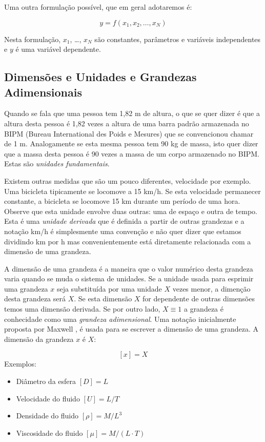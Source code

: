 Uma outra formulação possível, que em geral adotaremos é:

\[
y = f(x_1, x_2, \ldots, x_N)
\]

Nesta formulação, $x_1$, \ldots, $x_N$ são constantes, parâmetros e variáveis independentes e $y$ é uma variável dependente.



\subsection{Dimensões e Unidades e Grandezas Adimensionais}

Quando se fala que uma pessoa tem 1,82 m de altura, o que se quer dizer é que a altura desta pessoa é 1,82 vezes a altura de uma barra padrão armazenada no BIPM (Bureau International des Poids e Mesures) que se convencionou chamar de 1 m. Analogamente se esta mesma pessoa tem 90 kg de massa, isto quer dizer que a massa desta pessoa é 90 vezes a massa de um corpo armazenado no BIPM. Estas são \emph{unidades fundamentais}. 

Existem outras medidas que são um pouco diferentes, velocidade por exemplo. Uma bicicleta tipicamente se locomove a 15 km/h. Se esta velocidade permanecer constante, a bicicleta se locomove 15 km durante um período de uma hora. Observe que esta unidade envolve duas outras: uma de espaço e outra de tempo. Esta é uma \emph{unidade derivada} que é definida a partir de outras grandezas e a notação km/h é simplesmente uma convenção e não quer dizer que estamos dividindo km por h mas convenientemente está diretamente relacionada com a dimensão de uma grandeza.

A dimensão de uma grandeza é a maneira que o valor numérico desta grandeza varia quando se muda o sistema de unidades. Se a unidade usada para esprimir uma grandeza $x$ seja substituída por uma unidade $X$ vezes menor, a dimenção desta grandeza será $X$. Se esta dimensão $X$ for dependente de outras dimensões temos uma dimensão derivada. Se por outro lado, $X\equiv 1$ a grandeza é conhecidade como uma \emph{grandeza adimensional}. Uma notação inicialmente proposta por Maxwell \cite{Maxwell1871}, é usada para se escrever a dimensão de uma grandeza. A dimensão da grandeza $x$ é $X$:

\[
  [x] = X
\]
Exemplos:
\begin{itemize}
\item Diâmetro da esfera $[D] = L$
\item Velocidade do fluido $[U] = L/T$
\item Densidade do fluido $[\rho] = M / L^3$
\item Viscosidade do fluido $[\mu] = M / (L\cdot T)$
\end{itemize}

